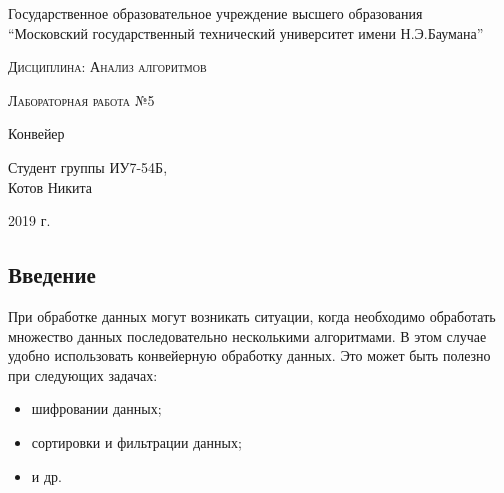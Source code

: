 \documentclass[a4paper,12pt]{article}
\begin{document}
    \begin{titlepage}

        \begin{center}
            \large
            Государственное образовательное учреждение высшего образования\\
            “Московский государственный технический университет имени Н.Э.Баумана”
            \vspace{3cm}
            
            \textsc{Дисциплина: Анализ алгоритмов}
            \vspace{0.5cm}
                
            \textsc{Лабораторная работа №5}
            \vspace{3cm}
            
            {\LARGE Конвейер}
            \vspace{3cm}
            
            Студент группы ИУ7-54Б,\\   
            Котов Никита
            \vfill
            
            2019 г.
            
            \end{center}
    \end{titlepage}
    
    \begin{center}
    	\tableofcontents
    \end{center}
	
	\setcounter{page}{2}
	\newpage
    \begin{center}
        \section*{Введение}
    \end{center}
        \label{sec:intro}

	При обработке данных могут возникать ситуации, когда необходимо обработать множество данных последовательно несколькими алгоритмами. В этом случае удобно использовать конвейерную обработку данных. Это может быть полезно при следующих задачах:
		\begin{itemize}
		    \item шифровании данных;
   		    \item сортировки и фильтрации данных;
   		    \item и др.
		\end{itemize}  
		
\end{document}
